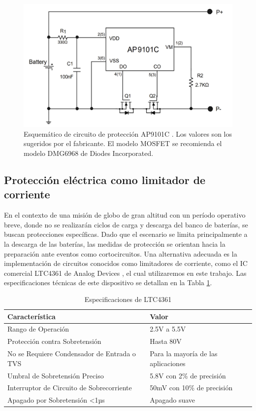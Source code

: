 \begin{figure}[h]
  \centering
  \includegraphics[width=\linewidth]{Pictures/AP9101C.png} 
  \caption{Esquemático de circuito de protección AP9101C \cite{diodes2023ap9101c}. Los valores son los sugeridos por el fabricante. El modelo MOSFET se recomienda el modelo DMG6968 de Diodes Incorporated.}
  \label{fig:EsquematicoAP9101C}
\end{figure}

\newpage
\subsection{Protección eléctrica como limitador de corriente}

En el contexto de una misión de globo de gran altitud con un período operativo breve, donde no se realizarán ciclos de carga y descarga del banco de baterías, se buscan protecciones específicas. Dado que el escenario se limita principalmente a la descarga de las baterías, las medidas de protección se orientan hacia la preparación ante eventos como cortocircuitos. Una alternativa adecuada es la implementación de circuitos conocidos como limitadores de corriente, como el IC comercial LTC4361 de Analog Devices \cite{LTC4361}, el cual utilizaremos en este trabajo. Las especificaciones técnicas de este dispositivo se detallan en la Tabla \ref{tab:especificaciones_LTC4361}.




\begin{table}[h]
  \centering
  \caption{Especificaciones de LTC4361}
  \begin{tabular}{l|l}
    \hline
    \textbf{Característica} & \textbf{Valor} \\
    \hline
    Rango de Operación & 2.5V a 5.5V \\
    Protección contra Sobretensión & Hasta 80V \\
    No se Requiere Condensador de Entrada o TVS & Para la mayoría de las aplicaciones \\
    Umbral de Sobretensión Preciso & 5.8V con 2\% de precisión \\
    Interruptor de Circuito de Sobrecorriente & 50mV con 10\% de precisión \\
    Apagado por Sobretensión <1µs & Apagado suave \\
    \hline
  \end{tabular}
  \label{tab:especificaciones_LTC4361}
\end{table}

